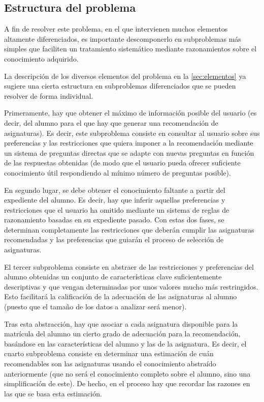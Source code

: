 
\subsection{Estructura del problema} \label{sec:subproblemas}

A fin de resolver este problema, en el que intervienen muchos elementos 
altamente diferenciados, es importante descomponerlo en subproblemas más 
simples que faciliten un tratamiento sistemático mediante razonamientos 
sobre el conocimiento adquirido. 

La descripción de los diversos elementos del problema en la 
\autoref{sec:elementos} ya sugiere una cierta estructura en subproblemas 
diferenciados que se pueden resolver de forma individual. 

Primeramente, hay que obtener el máximo de información posible del usuario 
(es decir, del alumno para el que hay que generar una recomendación de 
asignaturas). Es decir, este subproblema consiste en consultar al usuario 
sobre sus preferencias y las restricciones que quiera imponer a la 
recomendación mediante un sistema de preguntas directas que se adapte con 
nuevas preguntas en función de las respuestas obtenidas (de modo que el 
usuario pueda ofrecer suficiente conocimiento útil respondiendo al mínimo 
número de preguntas posible).

En segundo lugar, se debe obtener el conocimiento faltante a partir del 
expediente del alumno. Es decir, hay que inferir aquellas preferencias y 
restricciones que el usuario ha omitido mediante un sistema de reglas de 
razonamiento basadas en su expediente pasado. Con estas dos fases, se 
determinan completamente las restricciones que deberán cumplir las asignaturas 
recomendadas y las preferencias que guiarán el proceso de selección de 
asignaturas. 

El tercer subproblema consiste en abstraer de las restricciones y 
preferencias del alumno obtenidas un conjunto de características clave 
suficientemente descriptivas y que vengan determinadas por unos valores mucho 
más restringidos. Esto facilitará la calificación de la adecuación de las 
asignaturas al alumno (puesto que el tamaño de los datos a analizar será 
menor).

Tras esta abstracción, hay que asociar a cada asignatura disponible para la 
matrícula del alumno un cierto grado de adecuación para la recomendación, 
basándose en las características del alumno y las de la asignatura. Es decir, 
el cuarto subproblema consiste en determinar una estimación de cuán 
recomendables son las asignaturas usando el conocimiento abstraído 
anteriormente (que no será el conocimiento completo sobre el alumno, sino una 
simplificación de este). De hecho, en el proceso hay que recordar las razones 
en las que se basa esta estimación.

